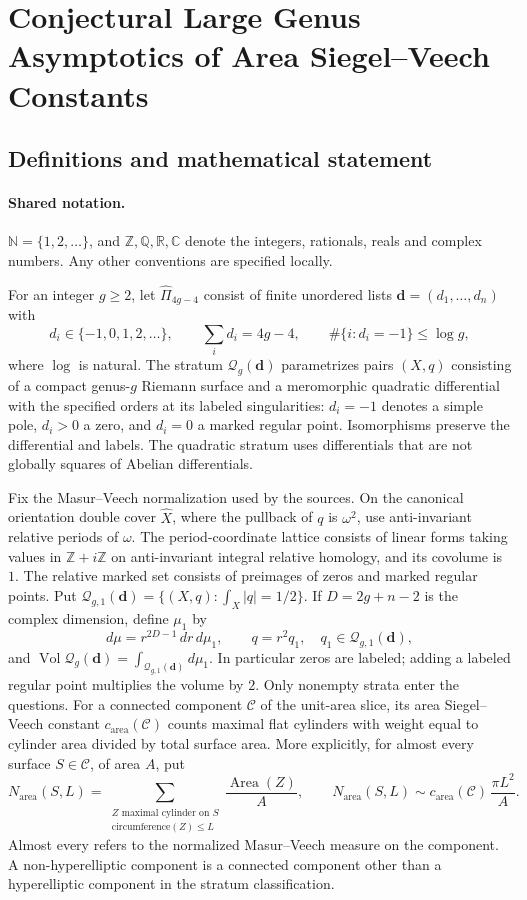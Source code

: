 \documentclass[11pt]{article}
\begin{document}
\section{Conjectural Large Genus Asymptotics of Area Siegel–Veech Constants}\label{statement}

\subsection{Definitions and mathematical statement}

\paragraph{Shared notation.}$\mathbb N=\{1,2,\ldots\}$, and $\mathbb Z,\mathbb Q,\mathbb R,\mathbb C$ denote the integers, rationals, reals and complex numbers. Any other conventions are specified locally.


For an integer $g\ge2$, let $\widehat\Pi_{4g-4}$ consist of finite unordered lists $\boldsymbol d=(d_1,\ldots,d_n)$ with
\[
 d_i\in\{-1,0,1,2,\ldots\},\qquad\sum_i d_i=4g-4,\qquad
 \#\{i:d_i=-1\}\le\log g,
\]
where $\log$ is natural. The stratum $\mathcal Q_g(\boldsymbol d)$ parametrizes pairs $(X,q)$ consisting of a compact genus-$g$ Riemann surface and a meromorphic quadratic differential with the specified orders at its labeled singularities: $d_i=-1$ denotes a simple pole, $d_i>0$ a zero, and $d_i=0$ a marked regular point. Isomorphisms preserve the differential and labels. The quadratic stratum uses differentials that are not globally squares of Abelian differentials.

Fix the Masur--Veech normalization used by the sources. On the canonical orientation double cover $\widehat X$, where the pullback of $q$ is $\omega^2$, use anti-invariant relative periods of $\omega$. The period-coordinate lattice consists of linear forms taking values in $\mathbb Z+i\mathbb Z$ on anti-invariant integral relative homology, and its covolume is $1$. The relative marked set consists of preimages of zeros and marked regular points. Put $\mathcal Q_{g,1}(\boldsymbol d)=\{(X,q):\int_X|q|=1/2\}$. If $D=2g+n-2$ is the complex dimension, define $\mu_1$ by
\[
 d\mu=r^{2D-1}\,dr\,d\mu_1,\qquad q=r^2q_1,\quad q_1\in\mathcal Q_{g,1}(\boldsymbol d),
\]
and $\operatorname{Vol}\mathcal Q_g(\boldsymbol d)=\int_{\mathcal Q_{g,1}(\boldsymbol d)}d\mu_1$. In particular zeros are labeled; adding a labeled regular point multiplies the volume by $2$. Only nonempty strata enter the questions.
For a connected component $\mathcal C$ of the unit-area slice, its area Siegel--Veech constant $c_{\mathrm{area}}(\mathcal C)$ counts maximal flat cylinders with weight equal to cylinder area divided by total surface area. More explicitly, for almost every surface $S\in\mathcal C$, of area $A$, put
\[
N_{\mathrm{area}}(S,L)=\sum_{\substack{Z\text{ maximal cylinder on }S\\\text{circumference}(Z)\le L}}
\frac{\operatorname{Area}(Z)}{A},\qquad
N_{\mathrm{area}}(S,L)\sim c_{\mathrm{area}}(\mathcal C)\,\frac{\pi L^2}{A}.
\]
Almost every refers to the normalized Masur--Veech measure on the component. A non-hyperelliptic component is a connected component other than a hyperelliptic component in the stratum classification.
\end{document}
